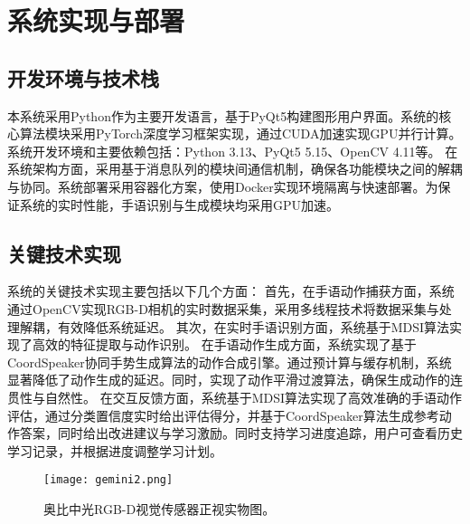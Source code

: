 \section{系统实现与部署}
\subsection{开发环境与技术栈}
本系统采用Python作为主要开发语言，基于PyQt5构建图形用户界面。系统的核心算法模块采用PyTorch深度学习框架实现，通过CUDA加速实现GPU并行计算。系统开发环境和主要依赖包括：Python 3.13、PyQt5 5.15、OpenCV 4.11等。
在系统架构方面，采用基于消息队列的模块间通信机制，确保各功能模块之间的解耦与协同。系统部署采用容器化方案，使用Docker实现环境隔离与快速部署。为保证系统的实时性能，手语识别与生成模块均采用GPU加速。%

\subsection{关键技术实现}
系统的关键技术实现主要包括以下几个方面：
首先，在手语动作捕获方面，系统通过OpenCV实现RGB-D相机的实时数据采集，采用多线程技术将数据采集与处理解耦，有效降低系统延迟。
其次，在实时手语识别方面，系统基于MDSI算法实现了高效的特征提取与动作识别。
在手语动作生成方面，系统实现了基于CoordSpeaker协同手势生成算法的动作合成引擎。通过预计算与缓存机制，系统显著降低了动作生成的延迟。同时，实现了动作平滑过渡算法，确保生成动作的连贯性与自然性。
在交互反馈方面，系统基于MDSI算法实现了高效准确的手语动作评估，通过分类置信度实时给出评估得分，并基于CoordSpeaker算法生成参考动作答案，同时给出改进建议与学习激励。同时支持学习进度追踪，用户可查看历史学习记录，并根据进度调整学习计划。


\begin{figure}
  \centering
  \texttt{[image: gemini2.png]}
  \caption{奥比中光RGB-D视觉传感器正视实物图。}
  \label{fig:aobi_robot}
\end{figure}
